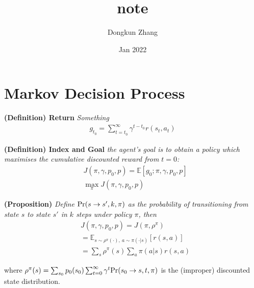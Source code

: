 
\usepackage[utf8]{inputenc}



\title{note}
\author{Dongkun Zhang}
\date{Jan 2022}



\maketitle

\section{Markov Decision Process}



\begin{tcolorbox}
\textbf{
    (Definition) Return
} 
\textit{
    Something
}
\begin{align*}
    g_{t_0} = \sum_{t=t_0}^{\infty}\gamma^{t-t_0}r(s_t,a_t)
\end{align*}
\end{tcolorbox}


\begin{tcolorbox}
\textbf{
    (Definition) Index and Goal
} 
\textit{
    the agent’s goal is to obtain a policy which maximises the cumulative discounted reward from $t=0$: 
}
\begin{align*}
    & J(\pi, \gamma, p_0, p) = \mathbb{E}[ g_0 ;\pi, \gamma, p_0, p] \\
    & \max_{\pi} J(\pi, \gamma, p_0, p)
\end{align*}
\end{tcolorbox}




\begin{tcolorbox}
\textbf{
    (Proposition)
} 
\textit{
    Define $ {\rm{Pr}}(s\to s',k,\pi) $ as the probability of transitioning from state $s$ to state $s'$ in $k$ steps under policy $\pi$, then
}
\begin{align*}
    & J(\pi, \gamma, p_0, p) = J(\pi, \rho^{\pi}) \\
    &= \mathbb{E}_{s \sim \rho^{\pi}(\cdot), \ a \sim \pi(\cdot|s)}[r(s,a)] \\
    &= \sum_{s} \rho^{\pi}(s) \sum_{a} \pi(a|s) r(s,a)
\end{align*}

where $ \rho^{\pi}(s) = \sum_{s_0} p_0(s_0) \sum_{t=0}^{\infty} \gamma^{t} {\rm{Pr}}(s_0 \to s,t,\pi) $ is the (improper) discounted state distribution.

\end{tcolorbox}

